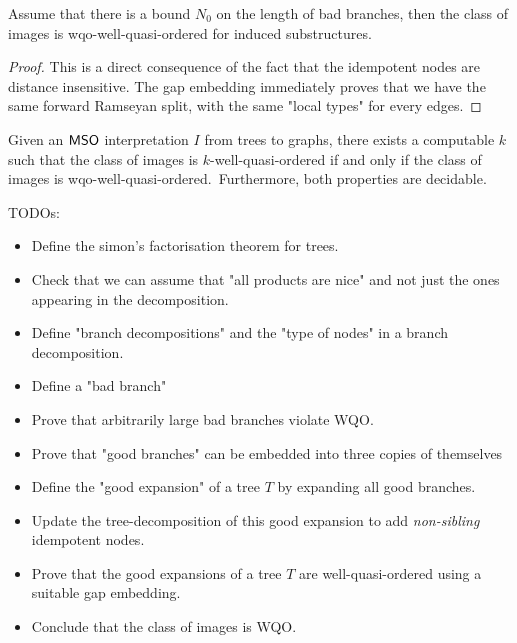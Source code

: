 \begin{theorem}
    Assume that there is a bound $N_0$ on the length of bad branches, then
    the class of images is wqo-well-quasi-ordered for induced substructures.
\end{theorem}
\begin{proof}
    This is a direct consequence of the fact that the idempotent nodes are distance insensitive.
    The gap embedding immediately proves that we have the same forward Ramseyan split,
    with the same "local types" for every edges.
\end{proof}

\begin{theorem}
    Given an $\mathsf{MSO}$ interpretation $I$ from trees to graphs, there exists a computable
    $k$ such that the class of images is $k$-well-quasi-ordered if and only if
    the class of images is wqo-well-quasi-ordered. Furthermore, both properties are decidable.
\end{theorem}

TODOs:
\begin{itemize}
    \item Define the simon's factorisation theorem for trees.
    \item Check that we can assume that "all products are nice" and not just the ones
        appearing in the decomposition.
    \item Define "branch decompositions" and the "type of nodes" in a branch decomposition.
    \item Define a "bad branch"
    \item Prove that arbitrarily large bad branches violate WQO.
    \item Prove that "good branches" can be embedded into three copies of themselves
    \item Define the "good expansion" of a tree $T$ by expanding all good branches.
    \item Update the tree-decomposition of this good expansion to add \emph{non-sibling}
        idempotent nodes.
    \item Prove that the good expansions of a tree $T$ are well-quasi-ordered using a 
        suitable gap embedding.
    \item Conclude that the class of images is WQO.
\end{itemize}

